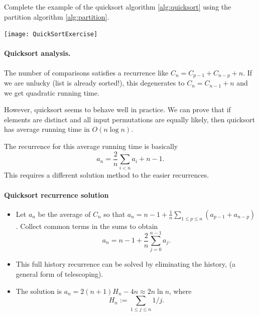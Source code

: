 \begin{Boxample}[2]
Complete the example of the quicksort algorithm \cref{alg:quicksort} using the partition algorithm \cref{alg:partition}.
\begin{center}
\texttt{[image: QuickSortExercise]}
\end{center}
\end{Boxample}

\paragraph{Quicksort analysis.}

The number of comparisons satisfies a recurrence like 
$C_n = C_{p-1} + C_{n - p} + n$. If we are unlucky (list is already sorted!), this degenerates to 
$C_{n} = C_{n-1} + n$ and we get quadratic running time.

However, quicksort seems to behave well in practice. We can prove that 
if elements are distinct and all input permutations are equally likely, then 
quicksort has average running time in $O(n \log n)$.

The recurrence for this average running time is basically
$$ a_n = \frac{2}{n} \sum_{i<n} a_i + n-1. $$ 
This requires a different solution method to the easier recurrences.

\paragraph{Quicksort recurrence solution}
\begin{itemize}
\item Let $a_n$ be the average of $C_n$ so that 
$a_n = n - 1 + \frac{1}{n} \sum_{1\leq p \leq n} (a_{p-1} + a_{n-p})$. 
Collect common terms in the sums to obtain
$$a_n = n - 1 + \frac{2}{n} \sum_{j=0}^{n-1} a_j.$$ 
\item This {full history} recurrence can be solved by 
{eliminating the history}, (a general form of {telescoping}). 
\item The solution is 
$a_n = 2 (n + 1) H_n - 4n \approx 2 n \ln n$, where 
$$H_n:= \sum_{1\leq j \leq n} 1/j.$$ 
\end{itemize}

    
